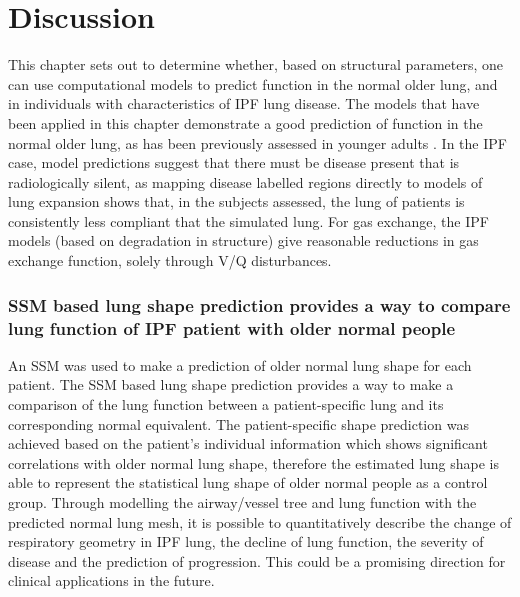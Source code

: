 \section{Discussion}
This chapter sets out to determine whether, based on structural parameters, one can use computational models to predict function in the normal older lung, and in individuals with characteristics of IPF lung disease. The models that have been applied in this chapter demonstrate a good prediction of function in the normal older lung, as has been previously assessed in younger adults \citep{tawhai2004ct, swan2012computational, clark2011interdependent}. In the IPF case, model predictions suggest that there must be disease present that is radiologically silent, as mapping disease labelled regions directly to models of lung expansion shows that, in the subjects assessed, the lung of patients is consistently less compliant that the simulated lung. For gas exchange, the IPF models (based on degradation in structure) give reasonable reductions in gas exchange function, solely through V/Q disturbances.

\subsubsection{SSM based lung shape prediction provides a way to compare lung function of IPF patient with older normal people}
An SSM was used to make a prediction of older normal lung shape for each patient. The SSM based lung shape prediction provides a way to make a comparison of the lung function between a patient-specific lung and its corresponding normal equivalent. The patient-specific shape prediction was achieved based on the patient's individual information which shows significant correlations with older normal lung shape, therefore the estimated lung shape is able to represent the statistical lung shape of older normal people as a control group. Through modelling the airway/vessel tree and lung function with the predicted normal lung mesh, it is possible to quantitatively describe the change of respiratory geometry in IPF lung, the decline of lung function, the severity of disease and the prediction of progression. This could be a promising direction for clinical applications in the future.

